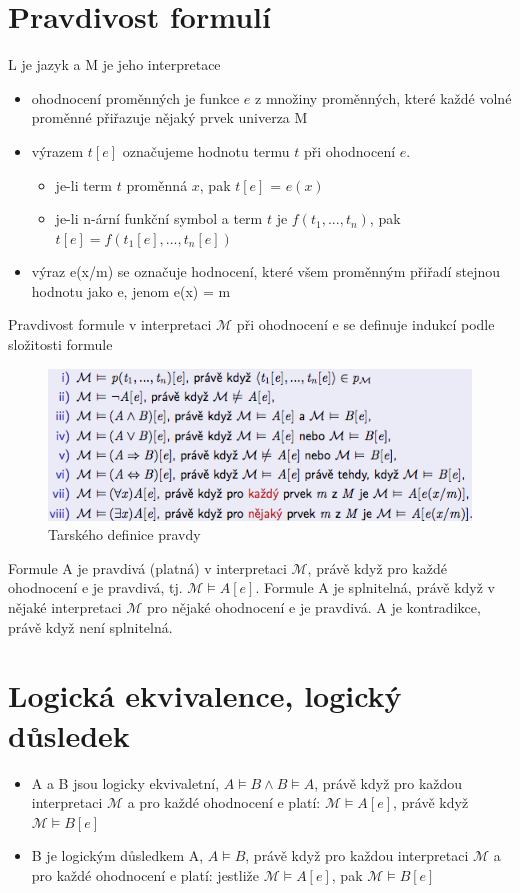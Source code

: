 \documentclass{szzclass}
\begin{document}
\section{Pravdivost formulí}
L je jazyk a M je jeho interpretace
\begin{itemize}
  \item ohodnocení proměnných je funkce $e$ z množiny proměnných, které každé volné proměnné přiřazuje nějaký prvek univerza M
  \item výrazem $t[e]$ označujeme hodnotu termu $t$ při ohodnocení $e$.
  \begin{itemize}
    \item je-li term $t$ proměnná $x$, pak $t[e]$ = $e(x)$
    \item je-li n-ární funkční symbol a term $t$ je $f(t_1,...,t_n)$, pak $t[e] = f(t_1[e],...,t_n[e])$
  \end{itemize}
  \item výraz e(x/m) se označuje hodnocení, které všem proměnným přiřadí stejnou hodnotu jako e, jenom e(x) = m
\end{itemize}
Pravdivost formule v interpretaci $\mathcal{M}$ při ohodnocení e se definuje indukcí podle složitosti formule
\begin{figure}[!h]
  \centering
  \includegraphics[width=\textwidth]{topics/bi-spol-15/images/logicalEvaluation.png}
  \caption{Tarského definice pravdy}
\end{figure}
Formule A je pravdivá (platná) v interpretaci $\mathcal{M}$, právě když pro každé ohodnocení e je pravdivá, tj. $\mathcal{M} \models A[e]$.
\newline
Formule A je splnitelná, právě když v nějaké interpretaci $\mathcal{M}$ pro nějaké ohodnocení e je pravdivá.
\newline
A je kontradikce, právě když není splnitelná.
\section{Logická ekvivalence, logický důsledek}
\begin{itemize}
  \item A a B jsou logicky ekvivaletní, $A \models B \wedge B \models A$, právě když pro každou interpretaci $\mathcal{M}$ a pro každé ohodnocení e platí: $\mathcal{M} \models A[e]$, právě když $\mathcal{M} \models B[e]$
  \item B je logickým důsledkem A, $A \models B$, právě když pro každou interpretaci $\mathcal{M}$ a pro každé ohodnocení e platí: jestliže $\mathcal{M} \models A[e]$, pak $\mathcal{M} \models B[e]$
\end{itemize}
\end{document}

